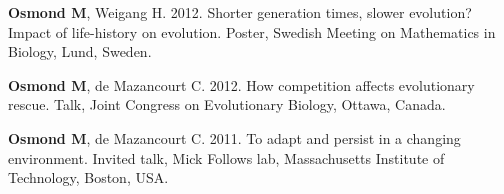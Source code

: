 \documentclass[12pt]{article}
\begin{document}


\textbf{Osmond M}, Weigang H. 2012. Shorter generation times, slower evolution? Impact of life-history on evolution. Poster, Swedish Meeting on Mathematics in Biology, Lund, Sweden.



\textbf{Osmond M}, de Mazancourt C. 2012. How competition affects evolutionary rescue. Talk, Joint Congress on Evolutionary Biology, Ottawa, Canada.


\textbf{Osmond M}, de Mazancourt C. 2011. To adapt and persist in a changing environment. Invited talk, Mick Follows lab, Massachusetts Institute of Technology, Boston, USA.



\end{document}

